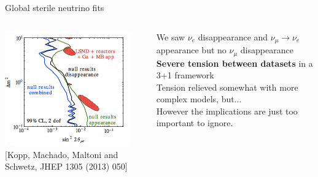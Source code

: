 %


%



\begin{frame}[t]{Global sterile neutrino fits}

\begin{columns}
  \begin{column}{0.70\textwidth}
    \centering
     \includegraphics[width=0.90\textwidth]{./images/beyond3nu/pheno/global3p1.png}\\
     {\scriptsize \color{blue}[Kopp, Machado, Maltoni and Schwetz, JHEP 1305 (2013) 050]}
  \end{column}
  \begin{column}{0.30\textwidth}
    {\small
     \centering
      We saw {\color{blue}$\nu_{e}$ disappearance} and {\color{blue}$\nu_{\mu} \rightarrow \nu_{e}$ appearance}
      but no {\color{red}$\nu_{\mu}$ disappearance}\\
      \vspace{0.2cm}
      {\bf Severe tension between datasets} in a 3+1 framework\\
      \vspace{0.2cm}
      Tension relieved somewhat with more complex models, but...\\
      \vspace{0.2cm}
      However the implications are just too important to ignore.\\
    }
  \end{column}
\end{columns}
\end{frame}


